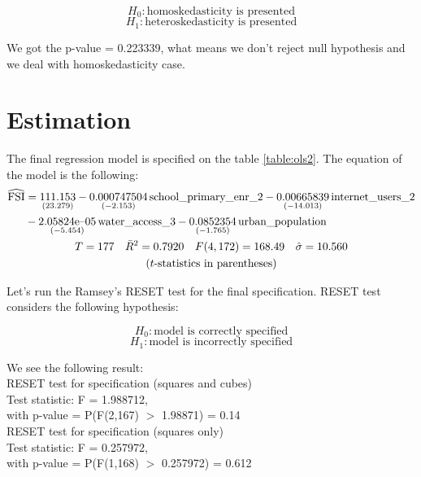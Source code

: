 \documentclass{article}
\begin{document}
$$H_0: \text{homoskedasticity is presented}$$
$$H_1: \text{heteroskedasticity is presented}$$

We got the p-value = 0.223339, what means we don't reject null hypothesis and we deal with homoskedasticity case. 



\section{Estimation}

The final regression model is specified on the table \ref{table:ols2}. The equation of the model is the following:\\


\begin{gather}
\begin{split}
\widehat{\rm FSI} &= 
\underset{(23.279)}{111.153}
-\underset{(-2.153)}{0.000747504}\,\mbox{school\_primary\_enr\_2}
-\underset{(-14.013)}{0.00665839}\,\mbox{internet\_users\_2}\\
& -\underset{(-5.454)}{2.05824\textrm{e--05}}\,\mbox{water\_access\_3}
-\underset{(-1.765)}{0.0852354}\,\mbox{urban\_population}
\end{split}
 \notag \\
T = 177 \quad \bar{R}^2 = 0.7920 \quad F(4,172) = 168.49 \quad \hat{\sigma} = 10.560 \notag \\
\centerline{($t$-statistics in parentheses)} \notag
\end{gather}


Let's run the Ramsey’s RESET test for the final specification. RESET test considers the following hypothesis:

$$H_0: \text{model is correctly specified}$$
$$H_1: \text{model is incorrectly specified}$$

\noindent We see the following result:\\

\noindent RESET test for specification (squares and cubes)\\
Test statistic: F = 1.988712,\\
with p-value = P(F(2,167) $>$ 1.98871) = 0.14\\

\noindent RESET test for specification (squares only)\\
Test statistic: F = 0.257972,\\
with p-value = P(F(1,168) $>$ 0.257972) = 0.612\\
\end{document}
